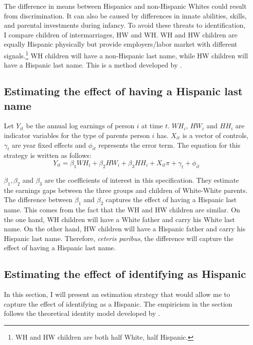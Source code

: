 \documentclass{wptemp}
\begin{document}
The difference in means between Hispanics and non-Hispanic Whites could result from discrimination. It can also be caused by differences in innate abilities, skills, and parental investments during infancy. To avoid these threats to identification, I compare children of intermarriages, HW and WH. WH and HW children are equally Hispanic physically but provide employers/labor market with different signals.\footnote{WH and HW children are both half White, half Hispanic.} WH children will have a non-Hispanic last name, while HW children will have a Hispanic last name. This is a method developed by \citet{rubinstein2014pride}.

\subsection{Estimating the effect of having a Hispanic last name}

Let $Y_{it}$ be the annual log earnings of person $i$ at time $t$. $WH_{i}$, $HW_{i}$ and $HH_{i}$ are indicator variables for the type of parents person $i$ has. $X_{it}$ is a vector of controls, $\gamma_{t}$ are year fixed effects and $\phi_{it}$ represents the error term. The equation for this strategy is written as follows:
\begin{equation} \label{eq:1a}
Y_{it} = \beta_{1} WH_{i} +\beta_{2} HW_{i} + \beta_{3} HH_{i} + X_{it} \pi + \gamma_{t}+\phi_{it}
\end{equation}

$\beta_{1}, \beta_{2}$ and $\beta_{3}$ are the coefficients of interest in this specification. They estimate the earnings gaps between the three groups and children of White-White parents. The difference between $\beta_{1}$ and $\beta_{2}$ captures the effect of having a Hispanic last name. This comes from the fact that the WH and HW children are similar. On the one hand, WH children will have a White father and carry his White last name. On the other hand, HW children will have a Hispanic father and carry his Hispanic last name. Therefore, \textit{ceteris paribus}, the difference will capture the effect of having a Hispanic last name.

\subsection{Estimating the effect of identifying as Hispanic}

In this section, I will present an estimation strategy that would allow me to capture the effect of identifying as a Hispanic. The empiricism in the section follows the theoretical identity model developed by \citet{akerlof2000economics}. 
\end{document}
